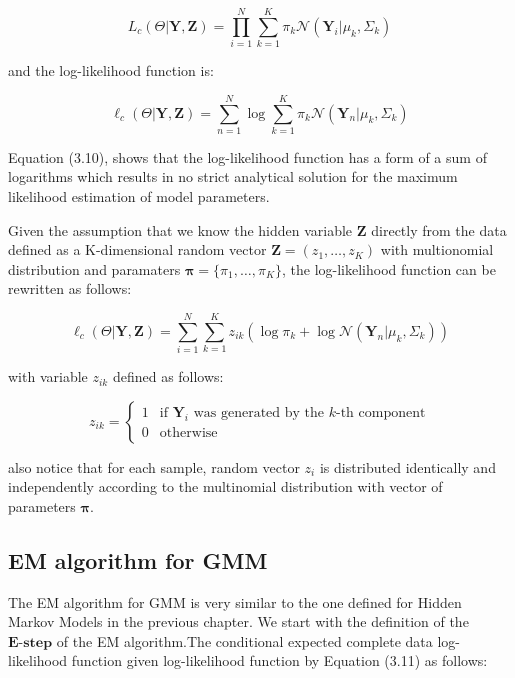\begin{equation}
    L_c(\Theta|\textbf{Y},\textbf{Z}) = \prod_{i=1}^{N} \sum_{k=1}^{K} \pi_k \mathcal{N}(\textbf{Y}_i|\mu_k,\Sigma_k)
\end{equation}

and the log-likelihood function is:

\begin{equation}
    \ell_c(\Theta|\textbf{Y},\textbf{Z}) = \sum_{n=1}^{N} \log \sum_{k=1}^{K} \pi_k \mathcal{N}(\textbf{Y}_n|\mu_k,\Sigma_k)
\end{equation}

Equation (3.10), shows that the log-likelihood function has a form of a sum of logarithms which results in no strict analytical solution for the maximum likelihood estimation of model parameters.

Given the assumption that we know the hidden variable $\textbf{Z}$ directly from the data defined as a K-dimensional random vector $\textbf{Z}=(z_1,\ldots,z_K)$ 
with multionomial distribution and paramaters $\boldsymbol{\pi} = \{\pi_1,\ldots,\pi_K\}$, the log-likelihood function can be rewritten as follows:

\begin{equation}
    \ell_c(\Theta|\textbf{Y},\textbf{Z}) = \sum_{i=1}^{N} \sum_{k=1}^{K} z_{ik} \left(\log \pi_k + \log \mathcal{N}(\textbf{Y}_n|\mu_k,\Sigma_k)\right)
\end{equation}

with variable $z_{ik}$ defined as follows:

\begin{equation}
    z_{ik} = \begin{cases}
        1 & \text{if } \textbf{Y}_i \text{ was generated by the } k\text{-th component} \\
        0 & \text{otherwise}
    \end{cases}
\end{equation}

also notice that for each sample, random vector $z_{i}$ is distributed identically and independently according to the multinomial distribution with vector of parameters $\boldsymbol{\pi}$.

\subsection{EM algorithm for GMM}

The EM algorithm for GMM is very similar to the one defined for Hidden Markov Models in the previous chapter. 
We start with the definition of the $\textbf{E-step}$ of the EM algorithm.The conditional expected complete 
data log-likelihood function given log-likelihood function by Equation (3.11) as follows:

